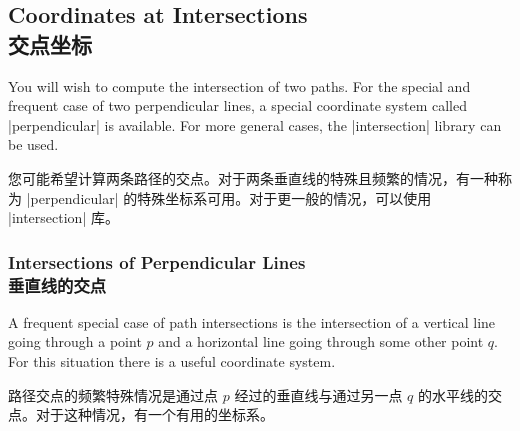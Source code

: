 \subsection{Coordinates at Intersections\\交点坐标}
\label{section-intersection-coordinates}

You will wish to compute the intersection of two paths. For the special and
frequent case of two perpendicular lines, a special coordinate system called
|perpendicular| is available. For more general cases, the |intersection|
library can be used.

您可能希望计算两条路径的交点。对于两条垂直线的特殊且频繁的情况，有一种称为 |perpendicular| 的特殊坐标系可用。对于更一般的情况，可以使用 |intersection| 库。


\subsubsection{Intersections of Perpendicular Lines\\垂直线的交点}

A frequent special case of path intersections is the intersection of a vertical
line going through a point $p$ and a horizontal line going through some other
point $q$. For this situation there is a useful coordinate system.

路径交点的频繁特殊情况是通过点 $p$ 经过的垂直线与通过另一点 $q$ 的水平线的交点。对于这种情况，有一个有用的坐标系。



